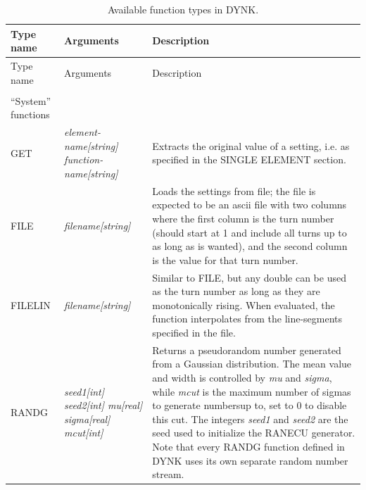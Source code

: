 \documentclass[a4paper,11pt]{report}
\begin{document}
\pagebreak
\begin{center}
\begin{longtable}{|p{2.25cm} | p{4cm} p{9.5cm}|}
  \caption{Available function types in DYNK.}
  \label{tab:DYNK_FUN} \\*
  \hline
  \rowcolor{blue!30}
  Type name & Arguments & Description \\*
  \hline
  \endfirsthead

  \hline
  \rowcolor{blue!30}
  Type name & Arguments & Description \\*
  \endhead

  \rowcolor{gray!15}
  \multicolumn{3}{|c|}{(The table continues on the next page)}\\*
  \hline
  \endfoot
  
  \hline
  \endlastfoot

  \rowcolor{blue!15}
  ``System'' functions & & \\*

  GET        & \emph{element-name[string] function-name[string]} & 
  Extracts the original value of a setting, i.e. as specified in the SINGLE ELEMENT section. \\*

  FILE       & \emph{filename[string]} &
  Loads the settings from file; the file is expected to be an ascii file with two columns where the first column is the turn number (should start at 1 and include all turns up to as long as is wanted), and the second column is the value for that turn number.\\*
  
  FILELIN    & \emph{filename[string]} &
  Similar to FILE, but any double can be used as the turn number as long as they are monotonically rising.
  When evaluated, the function interpolates from the line-segments specified in the file. \\*
  
  RANDG      & \emph{seed1[int] seed2[int] mu[real] sigma[real] mcut[int]} &
  Returns a pseudorandom number generated from a Gaussian distribution.
  The mean value and width is controlled by \emph{mu} and \emph{sigma}, while \emph{mcut} is the maximum number of sigmas to generate numbersup to, set to 0 to disable this cut. 
  The integers \emph{seed1} and \emph{seed2} are the seed used to initialize the RANECU generator. 
  Note that every RANDG function defined in DYNK uses its own separate random number stream.\\


\end{longtable}
\end{center}
\end{document}
